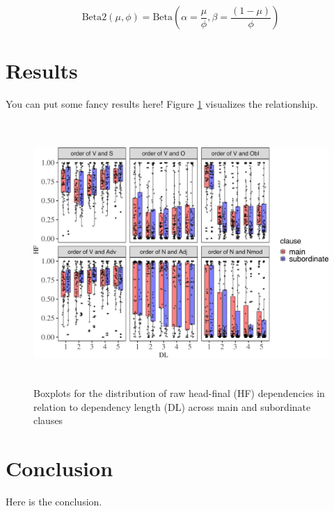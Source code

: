 \documentclass[
]{article}
\begin{document}
\begin{equation*}
\text{Beta2} \left(\mu, \phi \right) = \text{Beta} \left(\alpha = \frac{\mu}{\phi}, \beta = \frac{\left(1 - \mu \right)}{\phi} \right)
\end{equation*}

\section{Results}\label{results}

You can put some fancy results here! Figure \ref{fig-raw-dist}
visualizes the relationship.

\captionsetup{margin=1cm}

\begin{figure}[htpb]
\centering
\includegraphics[width=14cm, height=10cm]{figures/relationship between DL and HF-1.pdf}
\caption{Boxplots for the distribution of raw head-final (HF) dependencies in relation to dependency length (DL) across main and subordinate clauses} 
\label{fig-raw-dist}
\end{figure}

\section{Conclusion}\label{conclusion}

Here is the conclusion. \setlength{\parskip}{0pt} \raggedright
{}

\printbibliography[title=References]


\end{document}
